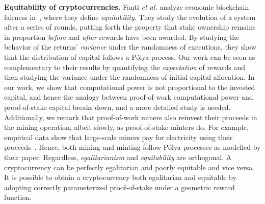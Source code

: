 \noindent\textbf{Equitability of cryptocurrencies.}
Fanti \textit{et al.} analyze economic blockchain fairness
in~\cite{equitability}, where they define \emph{equitability}. They study the
evolution of a system after a series of rounds, putting forth the property that
stake ownership remains in proportion \emph{before} and \emph{after} rewards
have been awarded. By studying the behavior of the returns' \emph{variance}
under the randomness of executions, they show that the distribution of capital
follows a Pólya process. Our work can be seen as complementary to 
their results by quantifying the \emph{expectation}
of rewards and then studying the variance under the randomness of initial capital
allocation. In our work, we show that
computational power is not proportional to the invested capital, and hence the
analogy between proof-of-work computational power and proof-of-stake capital
breaks down, and a more detailed study is needed. Additionally, we remark that
proof-of-work miners also reinvest their proceeds in the mining operation,
albeit slowly, as proof-of-stake minters do. For example, empirical data show
that large-scale miners pay for electricity using their
proceeds~\cite{kharif2018}. Hence, both mining and minting follow Pólya
processes as modelled by their paper.
Regardless, \emph{egalitarianism} and \emph{equitability} are orthogonal. A
cryptocurrency can be perfectly egalitarian and poorly equitable and vice versa.
It is possible to obtain a cryptocurrency both egalitarian and equitable by
adopting correctly parameterized proof-of-stake under a geometric reward
function.

